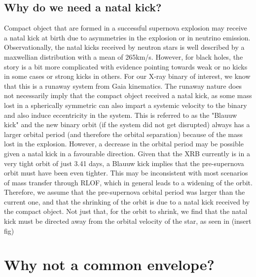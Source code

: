 \documentclass[linenumbers,trackchanges,twocolumn]{aastex701}
\begin{document}
\subsection{Why do we need a natal kick?}

Compact object that are formed in a successful supernova explosion may receive a natal kick at birth due to asymmetries in the explosion or in neutrino emission. Observationally, the natal kicks received by neutron stars is well described by a maxwellian distribution with a mean of 265km/s. However, for black holes, the story is a bit more complicated with evidence pointing towards weak or no kicks in some cases or strong kicks in others. For our X-ray binary of interest, we know that this is a runaway system from Gaia kinematics. The runaway nature does not necessarily imply that the compact object received a natal kick, as some mass lost in a spherically symmetric can also impart a systemic velocity to the binary and also induce eccentricity in the system. This is referred to as the "Blauuw kick" and the new binary orbit (if the system did not get disrupted) always has a larger orbital period (and therefore the orbital separation) because of the mass lost in the explosion. However, a decrease in the orbital period may be possible given a natal kick in a favourable direction. Given that the XRB currently is in a very tight orbit of just 3.41 days, a Blauuw kick implies that the pre-supernova orbit must have been even tighter. This may be inconsistent with most scenarios of mass transfer through RLOF, which in general leads to a widening of the orbit. Therefore, we assume that the pre-supernova orbital period was larger than the current one, and that the shrinking of the orbit is due to a natal kick received by the compact object. Not just that, for the orbit to shrink, we find that the natal kick must be directed away from the orbital velocity of the star, as seen in (insert fig)

\section{Why not a common envelope?}
\end{document}
